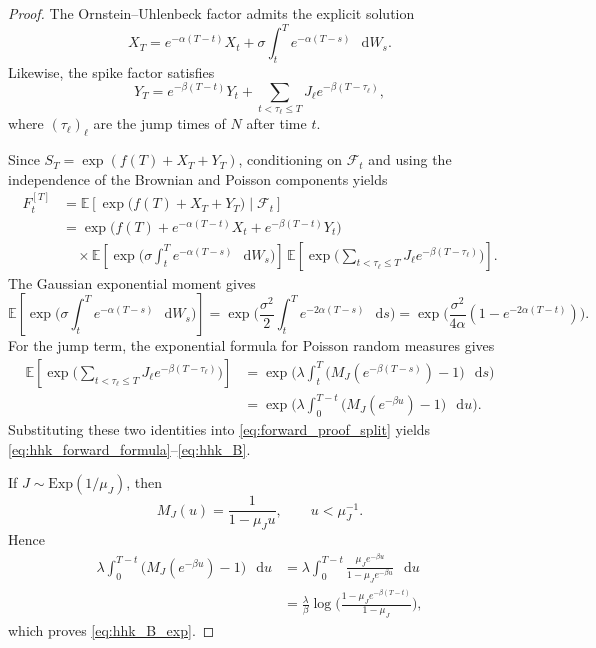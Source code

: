 \documentclass[10pt,a4paper,reqno]{amsart}
\newcommand{\<}{\langle}
\renewcommand{\>}{\rangle}
\theoremstyle{example}
\newcommand*\D{\mathop{}\!\mathrm{d}}
\begin{document}
\begin{proof}
The Ornstein--Uhlenbeck factor admits the explicit solution
\begin{equation}
\label{eq:X_solution_hedge}
X_T
=
e^{-\alpha(T-t)} X_t
+
\sigma \int_t^T e^{-\alpha(T-s)}\,\D W_s.
\end{equation}
Likewise, the spike factor satisfies
\begin{equation}
\label{eq:Y_solution_hedge}
Y_T
=
e^{-\beta(T-t)} Y_t
+
\sum_{t<\tau_\ell\le T} J_\ell e^{-\beta(T-\tau_\ell)},
\end{equation}
where $(\tau_\ell)_\ell$ are the jump times of $N$ after time $t$.

Since $S_T=\exp(f(T)+X_T+Y_T)$, conditioning on $\mathcal{F}_t$ and using the independence of the
Brownian and Poisson components yields
\begin{align}
F_t^{[T]}
&=
\mathbb{E}\!\left[
\exp\!\big(f(T)+X_T+Y_T\big)
\mid \mathcal{F}_t
\right]
\nonumber\\
&=
\exp\!\Big(
f(T)+e^{-\alpha(T-t)}X_t+e^{-\beta(T-t)}Y_t
\Big)
\nonumber\\
&\quad\times
\mathbb{E}\!\left[
\exp\!\Big(
\sigma \int_t^T e^{-\alpha(T-s)}\,\D W_s
\Big)
\right]
\,
\mathbb{E}\!\left[
\exp\!\Big(
\sum_{t<\tau_\ell\le T} J_\ell e^{-\beta(T-\tau_\ell)}
\Big)
\right].
\label{eq:forward_proof_split}
\end{align}
The Gaussian exponential moment gives
\[
\mathbb{E}\!\left[
\exp\!\Big(
\sigma \int_t^T e^{-\alpha(T-s)}\,\D W_s
\Big)
\right]
=
\exp\!\Big(
\frac{\sigma^2}{2}
\int_t^T e^{-2\alpha(T-s)}\,\D s
\Big)
=
\exp\!\Big(
\frac{\sigma^2}{4\alpha}(1-e^{-2\alpha(T-t)})
\Big).
\]
For the jump term, the exponential formula for Poisson random measures gives
\begin{align*}
\mathbb{E}\!\left[
\exp\!\Big(
\sum_{t<\tau_\ell\le T} J_\ell e^{-\beta(T-\tau_\ell)}
\Big)
\right]
&=
\exp\!\Bigg(
\lambda
\int_t^T
\Big(
M_J(e^{-\beta(T-s)})-1
\Big)\,\D s
\Bigg) \\
&=
\exp\!\Bigg(
\lambda
\int_0^{T-t}
\Big(
M_J(e^{-\beta u})-1
\Big)\,\D u
\Bigg).
\end{align*}
Substituting these two identities into \eqref{eq:forward_proof_split} yields
\eqref{eq:hhk_forward_formula}--\eqref{eq:hhk_B}.

If $J\sim \mathrm{Exp}(1/\mu_J)$, then
\[
M_J(u)=\frac{1}{1-\mu_J u},
\qquad
u<\mu_J^{-1}.
\]
Hence
\begin{align*}
\lambda \int_0^{T-t}\Big(M_J(e^{-\beta u})-1\Big)\,\D u
&=
\lambda \int_0^{T-t}
\frac{\mu_J e^{-\beta u}}{1-\mu_J e^{-\beta u}}\,\D u \\
&=
\frac{\lambda}{\beta}
\log\!\Bigg(
\frac{1-\mu_J e^{-\beta(T-t)}}{1-\mu_J}
\Bigg),
\end{align*}
which proves \eqref{eq:hhk_B_exp}.
\end{proof}
\end{document}
